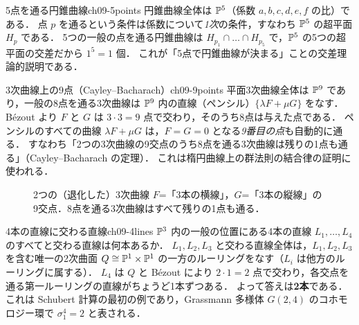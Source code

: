 \begin{myex}{5点を通る円錐曲線}{ch09-5points}
円錐曲線全体は $\mathbb{P}^5$（係数 $a,b,c,d,e,f$ の比）である．
点 $p$ を通るという条件は係数について\emph{1次}の条件，すなわち $\mathbb{P}^5$ の超平面 $H_p$ である．
5つの一般の点を通る円錐曲線は $H_{p_1}\cap\dots\cap H_{p_5}$ で，$\mathbb{P}^5$ の5つの超平面の交差だから $1^5=1$ 個．
これが「5点で円錐曲線が決まる」ことの交差理論的説明である．
\end{myex}

\begin{myex}{3次曲線上の9点（Cayley--Bacharach）}{ch09-9points}
平面3次曲線全体は $\mathbb{P}^9$ であり，一般の8点を通る3次曲線は $\mathbb{P}^9$ 内の直線（ペンシル）$\{\lambda F+\mu G\}$ をなす．
B\'ezout より $F$ と $G$ は $3\cdot3=9$ 点で交わり，そのうち8点は与えた点である．
ペンシルのすべての曲線 $\lambda F+\mu G$ は，$F=G=0$ となる\emph{9番目の点}も自動的に通る．
すなわち「2つの3次曲線の9交点のうち8点を通る3次曲線は残りの1点も通る」（Cayley--Bacharach の定理）．
これは楕円曲線上の群法則の結合律の証明に使われる．
\end{myex}

\begin{figure}[htbp]
\centering
{}
\caption{2つの（退化した）3次曲線 $F$=「3本の横線」，$G$=「3本の縦線」の9交点．8点を通る3次曲線はすべて残りの1点も通る．}
\label{fig:ch09-9points}
\end{figure}

\begin{myex}{4本の直線に交わる直線}{ch09-4lines}
$\mathbb{P}^3$ 内の一般の位置にある4本の直線 $L_1,\dots,L_4$ のすべてと交わる直線は何本あるか．
$L_1,L_2,L_3$ と交わる直線全体は，$L_1,L_2,L_3$ を含む唯一の2次曲面 $Q\cong\mathbb{P}^1\times\mathbb{P}^1$ の一方のルーリングをなす（$L_i$ は他方のルーリングに属する）．
$L_4$ は $Q$ と B\'ezout により $2\cdot1=2$ 点で交わり，各交点を通る第一ルーリングの直線がちょうど1本ずつある．
よって答えは\textbf{2本}である．
これは Schubert 計算の最初の例であり，Grassmann 多様体 $G(2,4)$ のコホモロジー環で $\sigma_1^4=2$ と表される．
\end{myex}

